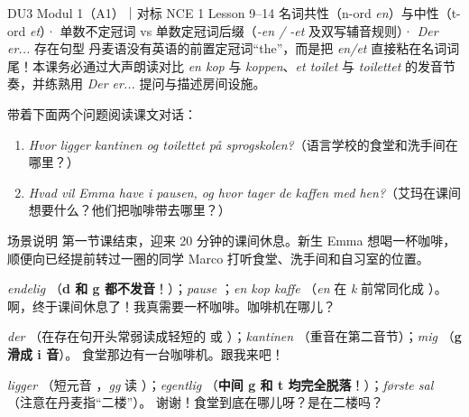 {DU3 Modul 1（A1）｜对标 NCE 1 Lesson 9--14}
{名词共性（n-ord \textit{en}）与中性（t-ord \textit{et}）· 单数不定冠词 vs 单数定冠词后缀（\textit{-en / -et} 及双写辅音规则）· \textit{Der er...} 存在句型}
{丹麦语没有英语的前置定冠词“the”，而是把 \textit{en/et} 直接粘在名词词尾！本课务必通过大声朗读对比 \textit{en kop} 与 \textit{koppen}、\textit{et toilet} 与 \textit{toilettet} 的发音节奏，并练熟用 \textit{Der er...} 提问与描述房间设施。}

\begin{foerduleaeser}
带着下面两个问题阅读课文对话：
\begin{enumerate}
  \item \textit{Hvor ligger kantinen og toilettet på sprogskolen?}（语言学校的食堂和洗手间在哪里？）
  \item \textit{Hvad vil Emma have i pausen, og hvor tager de kaffen med hen?}（艾玛在课间想要什么？他们把咖啡带去哪里？）
\end{enumerate}
\end{foerduleaeser}


\begin{tipbox}{场景说明}
第一节课结束，迎来 20 分钟的课间休息。新生 Emma 想喝一杯咖啡，顺便向已经提前转过一圈的同学 Marco 打听食堂、洗手间和自习室的位置。
\end{tipbox}

{\textit{endelig} （\textbf{d 和 g 都不发音}！）；\textit{pause} ；\textit{en kop kaffe} （\textit{en} 在 \textit{k} 前常同化成 ）。}
{啊，终于课间休息了！我真需要一杯咖啡。咖啡机在哪儿？}

{\textit{der} （在存在句开头常弱读成轻短的  或 ）；\textit{kantinen} （重音在第二音节）；\textit{mig} （\textbf{g 滑成 i 音}）。}
{食堂那边有一台咖啡机。跟我来吧！}

{\textit{ligger} （短元音 ，\textit{gg} 读 ）；\textit{egentlig} （\textbf{中间 g 和 t 均完全脱落}！）；\textit{første sal} （注意在丹麦指“二楼”）。}
{谢谢！食堂到底在哪儿呀？是在二楼吗？}

